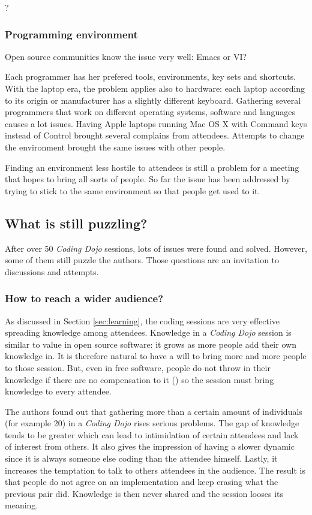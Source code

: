 ?

\subsubsection{Programming environment}

Open source communities know the issue very well: Emacs or VI?

Each programmer has her prefered tools, environments, key sets and
shortcuts. With the laptop era, the problem applies also to hardware:
each laptop according to its origin or manufacturer has a slightly
different keyboard. Gathering several programmers that work on
different operating systems, software and languages causes a lot
issues. Having Apple laptops running Mac OS X with Command keys
instead of Control brought several complains from attendees. Attempts
to change the environment brought the same issues with other people.

Finding an environment less hostile to attendees is still a problem
for a meeting that hopes to bring all sorts of people. So far the
issue has been addressed by trying to stick to the same environment so
that people get used to it.

\subsection{What is still puzzling?}\label{ssub:puzzles}

After over 50 \textit{Coding Dojo} sessions, lots of issues were found
and solved. However, some of them still puzzle the authors. Those
questions are an invitation to discussions and attempts.

\subsubsection{How to reach a wider audience?}

As discussed in Section \ref{sec:learning}, the coding sessions
are very effective spreading knowledge among attendees. Knowledge in a
\textit{Coding Dojo} session is similar to value in open source
software: it grows as more people add their own knowledge in. It is
therefore natural to have a will to bring more and more people to
those session. But, even in free software, people do not throw in
their knowledge if there are no compensation to it
(\cite{RishabGhosh}) so the session must bring knowledge to every
attendee.

The authors found out that gathering more than a certain amount of
individuals (for example 20) in a \textit{Coding Dojo} rises serious
problems. The gap of knowledge tends to be greater which can lead to
intimidation of certain attendees and lack of interest from others. It
also gives the impression of having a slower dynamic since it is
always someone else coding than the attendee himself. Lastly, it
increases the temptation to talk to others attendees in the
audience. The result is that people do not agree on an implementation
and keep erasing what the previous pair did. Knowledge is then never
shared and the session looses its meaning.

